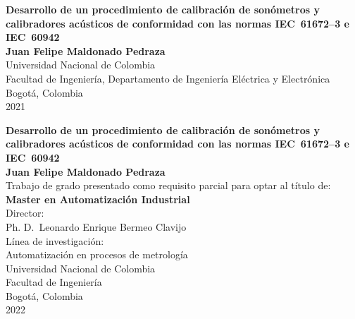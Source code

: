 \begin{center}
    \capstartfalse  %
    \begin{figure}
        \centering
    \end{figure}
    \thispagestyle{empty}
    \huge\textbf{Desarrollo de un procedimiento de calibración de sonómetros
    y calibradores acústicos de conformidad con las normas \mbox{IEC 61672--3} e \mbox{IEC 60942}}\\[4.0cm]
    \Large\textbf{Juan Felipe Maldonado Pedraza}\\[4.0cm]
    \small Universidad Nacional de Colombia\\
    Facultad de Ingeniería, Departamento de Ingeniería Eléctrica y Electrónica\\
    Bogotá, Colombia\\
    2021
\end{center}

\newpage{\pagestyle{empty}\cleardoublepage}
\newpage

\begin{center}
    \thispagestyle{empty}
    \huge\textbf{Desarrollo de un procedimiento de calibración de sonómetros
    y calibradores acústicos de conformidad con las normas \mbox{IEC 61672--3} e \mbox{IEC 60942}}\\[3.0cm]
    \Large\textbf{Juan Felipe Maldonado Pedraza}\\[3.0cm]
    \small Trabajo de grado presentado como requisito parcial para optar al título de:\\
    \textbf{Master en Automatización Industrial}\\[2.0cm]
    Director:\\
    Ph. D.\ Leonardo Enrique Bermeo Clavijo\\[2.0cm]
    Línea de investigación:\\
    Automatización en procesos de metrología\\
    Universidad Nacional de Colombia\\
    Facultad de Ingeniería\\
    Bogotá, Colombia\\
    2022
\end{center}

